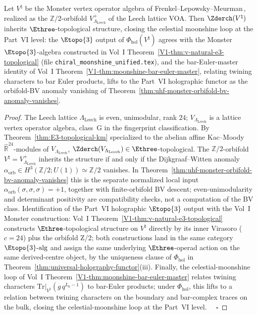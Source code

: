 \begin{theorem}
\label{thm:part-vi-moonshine-recovery}
Let $V^\natural$ be the Monster vertex operator algebra of
Frenkel--Lepowsky--Meurman\,\cite{FLM88}, realized as the
$\mathbb{Z}/2$-orbifold $V_{\Lambda_{\mathrm{Leech}}}^+$ of the Leech
lattice VOA. Then $\Zderch(V^\natural)$ inherits
$\Ethree$-topological structure, closing the celestial moonshine loop
at the Part~VI level: the $\Etopo{3}$ output of
$\Phi_{\mathrm{hol}}(V^\natural)$ agrees with the Monster
$\Etopo{3}$-algebra constructed in
Vol~I Theorem~\ref{V1-thm:v-natural-e3-topological} \textup{(}file
\texttt{chiral\_moonshine\_unified.tex}\textup{)}, and the bar-Euler-master
identity of Vol~I
Theorem~\ref{V1-thm:moonshine-bar-euler-master}, relating twining characters
to bar Euler products, lifts to the Part~VI holographic functor as the
orbifold-BV anomaly vanishing of
Theorem~\ref{thm:uhf-monster-orbifold-bv-anomaly-vanishes}.
\end{theorem}
\begin{proof}
The Leech lattice $\Lambda_{\mathrm{Leech}}$ is even, unimodular, rank
$24$; $V_{\Lambda_{\mathrm{Leech}}}$ is a lattice vertex operator
algebra, class~G in the fingerprint classification. By
Theorem~\ref{thm:E3-topological-km} specialized to the abelian affine
Kac--Moody $\widehat{\mathbb{R}}^{24}$-modules of
$V_{\Lambda_{\mathrm{Leech}}}$, $\Zderch(V_{\Lambda_{\mathrm{Leech}}})
\in \Ethree$-topological. The $\mathbb{Z}/2$-orbifold
$V^\natural = V_{\Lambda_{\mathrm{Leech}}}^+$ inherits the structure if
and only if the Dijkgraaf--Witten anomaly
$\alpha_{\mathrm{orb}} \in H^3(\mathbb{Z}/2; U(1)) \simeq \mathbb{Z}/2$
vanishes. In
Theorem~\ref{thm:uhf-monster-orbifold-bv-anomaly-vanishes} this is the
separate normalized local input
$\alpha_{\mathrm{orb}}(\sigma,\sigma,\sigma)=+1$, together with
finite-orbifold BV descent; even-unimodularity and determinant
positivity are compatibility checks, not a computation of the BV
class. Identification of the Part~VI holographic $\Etopo{3}$
output with the Vol~I Monster construction: Vol~I
Theorem~\ref{V1-thm:v-natural-e3-topological} constructs
$\Ethree$-topological structure on $V^\natural$ directly by its inner
Virasoro ($c=24$) plus the orbifold Z/2; both constructions land in the
same category $\Etopo{3}\text{-alg}$ and assign the same underlying
$\Ethree$-operad action on the same derived-centre object, by the
uniqueness clause of $\Phi_{\mathrm{hol}}$ in
Theorem~\ref{thm:universal-holography-functor}(iii). Finally, the
celestial-moonshine loop of Vol~I
Theorem~\ref{V1-thm:moonshine-bar-euler-master} relates twining characters
$\mathrm{Tr}|_{V^\natural}(g\,q^{L_0-1})$ to bar-Euler products; under
$\Phi_{\mathrm{hol}}$, this lifts to a relation between twining
characters on the boundary and bar-complex traces on the bulk, closing
the celestial-moonshine loop at the Part~VI level. $\quad\square$
\end{proof}

